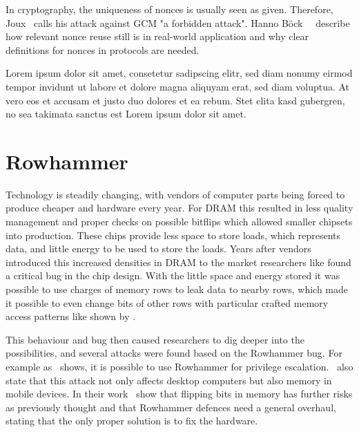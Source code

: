 In cryptography, the uniqueness of nonces is usually seen as given. Therefore,
Joux~\cite{NISTGCMcomment} calls his attack against GCM "a forbidden attack".
Hanno Böck~\etal~\cite{gcmnonceattack} describe how relevant nonce reuse still
is in real-world application and why clear definitions for nonces in protocols
are needed.

Lorem ipsum dolor sit amet, consetetur sadipscing elitr, sed diam nonumy eirmod
tempor invidunt ut labore et dolore magna aliquyam erat, sed diam voluptua. At
vero eos et accusam et justo duo dolores et ea rebum. Stet clita kasd gubergren,
no sea takimata sanctus est Lorem ipsum dolor sit amet.


\section{Rowhammer}

Technology is steadily changing, with vendors of computer parts being forced to
produce cheaper and hardware every year. For DRAM this resulted in less quality
management and proper checks on possible bitflips which allowed smaller chipsets
into production. These chips provide less space to store loads, which represents
data, and little energy to be used to store the loads. Years after vendors
introduced this increased densities in DRAM to the market researchers like
 found a critical bug in the chip design. With the
little space and energy stored it was possible to use charges of memory rows to
leak data to nearby rows, which made it possible to even change bits of other
rows with particular crafted memory access patterns like shown by
.

This behaviour and bug then caused researchers to dig deeper into the
possibilities, and several attacks were found based on the Rowhammer bug. For
example as~ shows, it is possible to use
Rowhammer for privilege escalation.~ also state that this
attack not only affects desktop computers but also memory in mobile devices. In
their work~ show that flipping bits in memory has
further risks as previously thought and that Rowhammer defences need a general
overhaul, stating that the only proper solution is to fix the hardware.


